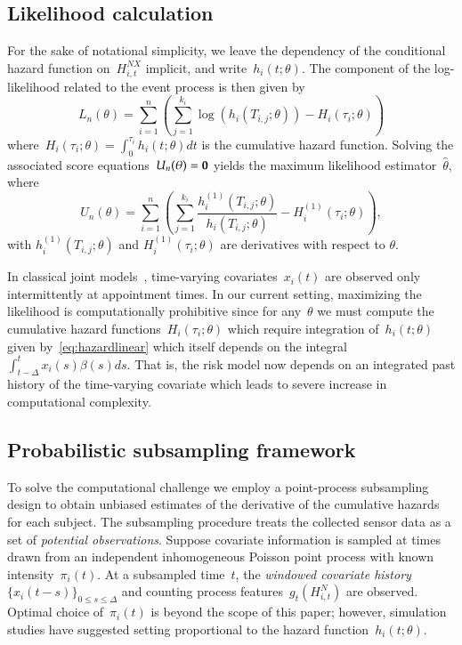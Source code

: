 \documentclass[12pt]{amsart}
\begin{document}
\subsection{Likelihood calculation}

For the sake of notational simplicity, we leave the dependency of the conditional hazard function on~$H_{i,t}^{NX}$ implicit, and write~$h_i (t; \theta)$. The component of the log-likelihood related to the event process is then given by
\[
  L_n (\theta) = \sum_{i=1}^{n} \left ( \sum_{j=1}^{k_i}
    \log \left( h_i \left( T_{i,j}; \theta
      \right) \right) - H_{i} \left( \tau_i; \theta \right) \right)
\]
where~$H_{i} (\tau_i ; \theta) = \int_{0}^{\tau_i} h_{i} (t; \theta) dt$ is the cumulative hazard function. Solving the associated score equations~$U_n (\theta) = {\bf 0}$ yields the maximum likelihood estimator~$\hat \theta$, where
\[
U_n (\theta) = \sum_{i=1}^{n} \left ( \sum_{j=1}^{k_i} \frac{h^{(1)}_i
    (T_{i,j}; \theta)}{h_i (T_{i,j}; \theta)} - H^{(1)}_{i} (\tau_i;
  \theta) \right),
\]
with $h_i^{(1)} (T_{i,j}; \theta)$ and $H_i^{(1)} (\tau_{i}; \theta)$ are derivatives with respect to $\theta$.

In classical joint models~\citep{Henderson2000, Tsiatis2004}, time-varying covariates~$x_i (t)$ are observed only intermittently at appointment times. In our current setting, maximizing the likelihood is computationally prohibitive since for any~$\theta$ we must compute the cumulative hazard functions~$H_{i} (\tau_i; \theta)$ which require integration of~$h_i(t;\theta)$ given by~\eqref{eq:hazardlinear} which itself depends on the integral~$\int_{t-\Delta}^t x_i (s) \beta(s) ds$.  That is, the risk model now depends on an integrated past history of the time-varying covariate which leads to severe increase in computational complexity.

\subsection{Probabilistic subsampling framework}

To solve the computational challenge we employ a point-process subsampling design to obtain unbiased estimates of the derivative of the cumulative hazards for each subject. The subsampling procedure treats the collected sensor data as a set of \emph{potential observations}. Suppose covariate information is sampled at times drawn from an independent inhomogeneous Poisson point process with known intensity~$\pi_i (t)$. At a subsampled time~$t$, the \emph{windowed covariate history} $\{ x_i (t-s)\}_{0 \leq s \leq \Delta}$ and counting process features~$g_t (H_{i,t}^N)$ are observed. Optimal choice of~$\pi_i (t)$ is beyond the scope of this paper; however, simulation studies have suggested setting proportional to the hazard function~$h_i (t; \theta)$.
\end{document}
